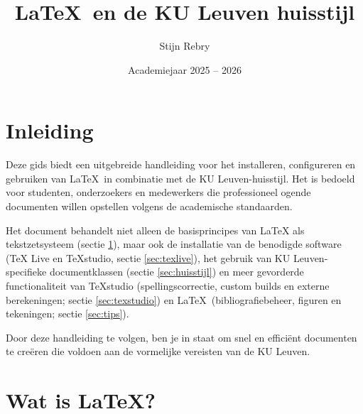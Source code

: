 \documentclass[kulak]{kulakarticle} %
\title{\LaTeX\ en de KU Leuven huisstijl}
\author{Stijn Rebry}
\date{Academiejaar 2025 -- 2026}
\begin{document}
	
\maketitle
	
\tableofcontents

\section*{Inleiding}

Deze gids biedt een uitgebreide handleiding voor het installeren, configureren en gebruiken van \LaTeX\ in combinatie met de KU Leuven-huisstijl. Het is bedoeld voor studenten, onderzoekers en medewerkers die professioneel ogende documenten willen opstellen volgens de academische standaarden.

Het document behandelt niet alleen de basisprincipes van LaTeX als tekstzetsysteem (sectie \ref{sec:latex}), maar ook de installatie van de benodigde software (TeX Live en TeXstudio, sectie \ref{sec:texlive}), het gebruik van KU Leuven-specifieke documentklassen (sectie \ref{sec:huisstijl}) en meer gevorderde functionaliteit van TeXstudio (spellingscorrectie, custom builds en externe berekeningen; sectie \ref{sec:texstudio}) en \LaTeX\ (bibliografiebeheer, figuren en tekeningen; sectie \ref{sec:tips}).

Door deze handleiding te volgen, ben je in staat om snel en efficiënt documenten te creëren die voldoen aan de vormelijke vereisten van de KU Leuven.

\section{Wat is \LaTeX?}
\label{sec:latex}
\end{document}
